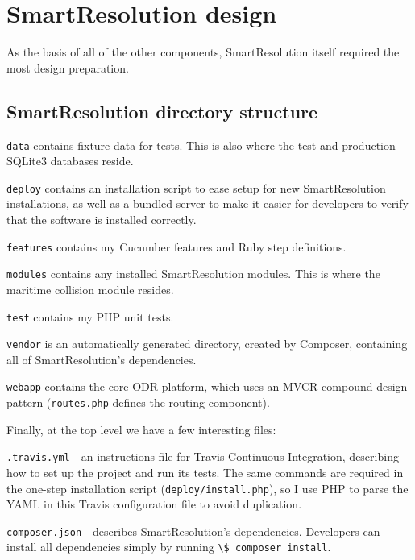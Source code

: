\section{SmartResolution design}

As the basis of all of the other components, SmartResolution itself required the most design preparation.

\subsection{SmartResolution directory structure}


\lstinline{data} contains fixture data for tests. This is also where the test and production SQLite3 databases reside.

\lstinline{deploy} contains an installation script to ease setup for new SmartResolution installations, as well as a bundled server to make it easier for developers to verify that the software is installed correctly.

\lstinline{features} contains my Cucumber features and Ruby step definitions.

\lstinline{modules} contains any installed SmartResolution modules. This is where the maritime collision module resides.

\lstinline{test} contains my PHP unit tests.

\lstinline{vendor} is an automatically generated directory, created by Composer, containing all of SmartResolution's dependencies.

\lstinline{webapp} contains the core ODR platform, which uses an MVCR compound design pattern (\lstinline{routes.php} defines the routing component).

Finally, at the top level we have a few interesting files:

\lstinline{.travis.yml} - an instructions file for Travis Continuous Integration, describing how to set up the project and run its tests. The same commands are required in the one-step installation script (\lstinline{deploy/install.php}), so I use PHP to parse the YAML in this Travis configuration file to avoid duplication.

\lstinline{composer.json} - describes SmartResolution's dependencies. Developers can install all dependencies simply by running \lstinline{\$ composer install}.

